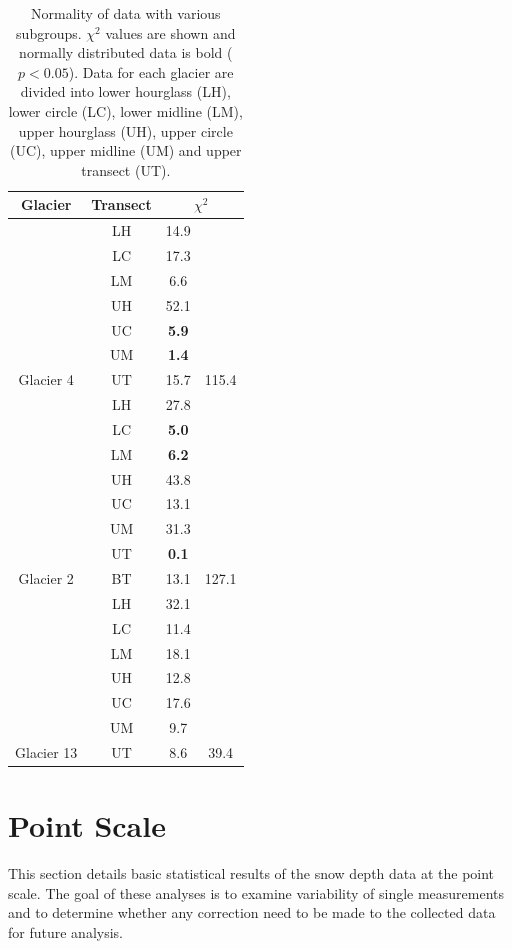 \documentclass{sfuthesis}
\newcommand{\transectAbb}{Data for each glacier are divided into lower hourglass (LH), lower circle (LC), lower midline (LM), upper hourglass (UH), upper circle (UC), upper midline (UM) and upper transect (UT).}
\begin{document}
{\begin{appendices}
\begin{table}
\centering
\caption[]{Normality of data with various subgroups. $\chi^2$ values are shown and normally distributed data is bold ($p<0.05$). \transectAbb}
\label{tab:normality}
\begin{tabular}{cccc}
\textbf{Glacier} & \textbf{Transect} & \multicolumn{2}{c}{\textbf{$\chi^2$}} \\ 
\hline
\hline 
& LH & 14.9 &   \\
  & LC & 17.3 &   \\
  & LM & 6.6 &   \\
  & UH & 52.1 &   \\
  & UC & \textbf{5.9} &   \\
& UM & \textbf{1.4} &   \\
\multirow{-7}{*}{Glacier 4} & UT & 15.7 & \multirow{-7}{*}{ 115.4} \\ \hline
 & LH & 27.8 &  \\
 & LC & \textbf{5.0} &  \\
 & LM & \textbf{6.2} &  \\
 & UH & 43.8 &  \\
 & UC & 13.1 &  \\
 & UM & 31.3 &  \\
 & UT & \textbf{0.1} &  \\
\multirow{-8}{*}{Glacier 2} & BT & 13.1 & \multirow{-8}{*}{127.1} \\ \hline
  
  & LH & 32.1 &   \\ 
  
  & LC & 11.4 &   \\
  
  & LM & 18.1 &   \\
  
  & UH & 12.8 &   \\
  
  & UC & 17.6 &   \\
  
  & UM & 9.7 &   \\
  
\multirow{-7}{*}{ Glacier 13} & UT & 8.6 & \multirow{-7}{*}{ 39.4}
\end{tabular}
\end{table}

\section{Point Scale}

This section details basic statistical results of the snow depth data at the point scale. The goal of these analyses is to examine variability of single measurements and to determine whether any correction need to be made to the collected data for future analysis. 


\end{appendices}}
\end{document}
